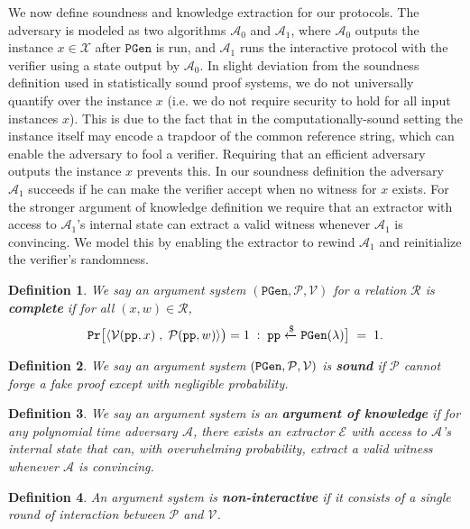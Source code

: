 \documentclass[11pt, lettersize, notitlepage, leqno, footskip=0.6cm]{article}
\newcommand{\ttt}{\texttt}
\newcommand{\mc}{\mathcal}
\newcommand{\lam}{\lambda}
\newcommand{\mP}{\mc{P}}
\newcommand{\A}{\mc{A}}
\newcommand{\V}{\mc{V}}
\newcommand{\vs}{\vspace{-0.15cm}}
\newcommand{\op}{overwhelming probability}
\newcommand{\E}{\mc{E}}
\newtheorem{Def}{Definition}[section]
\numberwithin{equation}{section}
\begin{document}
We now define soundness and knowledge extraction for our protocols. The adversary is modeled as two algorithms $\A_0$ and $\A_1$, where $\A_0$ outputs the instance $x \in \mc{X}$ after $\ttt{PGen}$ is run, and $\A_1$ runs the interactive protocol with the verifier using a state output by $\A_0$. In slight deviation from the soundness definition used in
statistically sound proof systems, we do not universally quantify over the instance
$x$ (i.e. we do not require security to hold for all input instances $x$). This is due to
the fact that in the computationally-sound setting the instance itself may encode a trapdoor of the common reference string, which can enable the adversary to fool a verifier. Requiring that an efficient adversary outputs the instance $x$ prevents this. In our soundness definition the adversary $\A_1$ succeeds
if he can make the verifier accept when no witness for $x$ exists. For the stronger argument of knowledge definition we require that an extractor with access to $\A_1$'s internal state can extract a valid witness whenever $\A_1$ is convincing. We model this
by enabling the extractor to rewind $\A_1$ and reinitialize the verifier's randomness.



\begin{Def} We say an argument system $(\ttt{PGen}, \mP, \V)$ for a relation $\mc{R}$ is \textbf{complete} if for all $(x,w)\in \mc{R}$, \vs $${\tt{Pr}}\big[\langle \V({\tt{pp}}, x)\;,\; \mP({\tt{pp}}, w)\rangle\big) =1\;:\; {\tt{pp}} \xleftarrow{\$} {\tt{PGen}}(\lam) \big]\; = \; 1. $$ \end{Def}

\begin{Def} We say an argument system $({\tt{PGen}}, \mP, \V)$ is \textbf{sound} if $\mP$ cannot forge a fake proof except with negligible probability. \end{Def}

\begin{Def} We say an argument system is an \textbf{argument of knowledge} if for any polynomial time adversary $\A$, there exists an extractor $\E$ with access to $\A$'s internal state that can, with \op, extract a valid witness whenever $\A$ is convincing. \end{Def}


\begin{Def} \normalfont An argument system is \textbf{non-interactive} if it consists of a single round of interaction between $\mP$ and $\V$.\end{Def}
\end{document}
